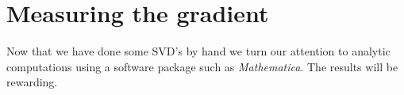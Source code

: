 \chapter{Measuring the gradient}
Now that we have done some SVD's by hand we turn our attention to analytic computations using a software package such as \textit{Mathematica}. The results will be rewarding.





\endinput